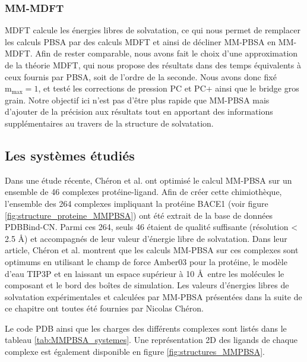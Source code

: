 \subsubsection{MM-MDFT}
MDFT calcule les énergies libres de solvatation, ce qui nous permet de remplacer les calculs PBSA par des calculs MDFT et ainsi de décliner MM-PBSA en MM-MDFT. Afin de rester comparable, nous avons fait le choix d'une approximation de la théorie MDFT, qui nous propose des résultats dans des temps équivalents à ceux fournis par PBSA, soit de l'ordre de la seconde. Nous avons donc fixé $\mathrm{m}_\mathrm{max}=1$, et testé les corrections de pression PC et PC+ ainsi que le bridge gros grain. Notre objectif ici n'est pas d'être plus rapide que MM-PBSA mais d'ajouter de la précision aux résultats tout en apportant des informations supplémentaires au travers de la structure de solvatation. 


\subsection{Les systèmes étudiés}
Dans une étude récente, Chéron et al.\cite{cheron_effect_2017} ont optimisé le calcul MM-PBSA sur un ensemble de 46 complexes protéine-ligand. Afin de créer cette chimiothèque, l'ensemble des 264 complexes impliquant la protéine BACE1 (voir figure \ref{fig:structure_proteine_MMPBSA}) ont été extrait de la base de données PDBBind-CN. Parmi ces 264, seuls 46 étaient de qualité suffisante (résolution < 2.5 \AA) et accompagnés de leur valeur d'énergie libre de solvatation. Dans leur article, Chéron et al. montrent que les calculs MM-PBSA sur ces complexes sont optimums en utilisant le champ de force Amber03 pour la protéine, le modèle d'eau TIP3P et en laissant un espace supérieur à 10 \AA\ entre les molécules le composant et le bord des boîtes de simulation. Les valeurs d'énergies libres de solvatation expérimentales et calculées par MM-PBSA présentées dans la suite de ce chapitre ont toutes été fournies par Nicolas Chéron.

Le code PDB ainsi que les charges des différents complexes sont listés dans le tableau \ref{tab:MMPBSA_systemes}. Une représentation 2D des ligands de chaque complexe est également disponible en figure \ref{fig:structures_MMPBSA}.








